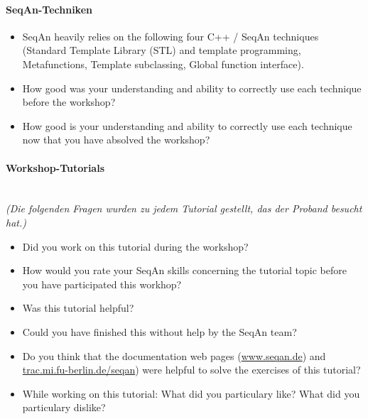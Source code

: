 \paragraph{SeqAn-Techniken}
\begin{itemize}
  \item SeqAn heavily relies on the following four C++ / SeqAn techniques (Standard Template Library (STL) and template programming, Metafunctions, Template subclassing, Global function interface).
  \item How good was your understanding and ability to correctly use each technique before the workshop?
  \item How good is your understanding and ability to correctly use each technique now that you have absolved the workshop?
\end{itemize}

\paragraph{Workshop-Tutorials} \hfill \\
\textit{(Die folgenden Fragen wurden zu jedem Tutorial gestellt, das der Proband besucht hat.)}
\begin{itemize}
  \item Did you work on this tutorial during the workshop?
  \item How would you rate your SeqAn skills concerning the tutorial topic before you have participated this workhop?
  \item Was this tutorial helpful?
  \item Could you have finished this without help by the SeqAn team?
  \item Do you think that the documentation web pages (\url{www.seqan.de}) and \url{trac.mi.fu-berlin.de/seqan}) were helpful to solve the exercises of this tutorial?
  \item While working on this tutorial: What did you particulary like? What did you particulary dislike?
\end{itemize}


